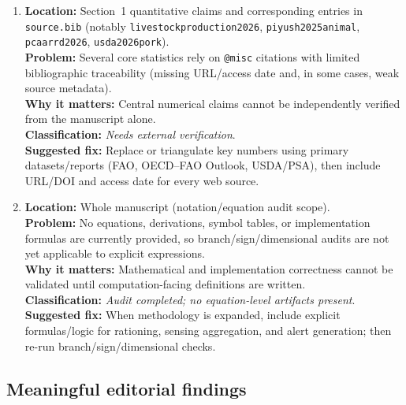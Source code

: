 \documentclass[11pt]{article}
\begin{document}
\begin{enumerate}[leftmargin=*]
  \item \textbf{Location:} Section~1 quantitative claims and corresponding entries in \texttt{source.bib} (notably \texttt{livestockproduction2026}, \texttt{piyush2025animal}, \texttt{pcaarrd2026}, \texttt{usda2026pork}).\\
        \textbf{Problem:} Several core statistics rely on \texttt{@misc} citations with limited bibliographic traceability (missing URL/access date and, in some cases, weak source metadata).\\
        \textbf{Why it matters:} Central numerical claims cannot be independently verified from the manuscript alone.\\
        \textbf{Classification:} \emph{Needs external verification}.\\
        \textbf{Suggested fix:} Replace or triangulate key numbers using primary datasets/reports (FAO, OECD--FAO Outlook, USDA/PSA), then include URL/DOI and access date for every web source.

  \item \textbf{Location:} Whole manuscript (notation/equation audit scope).\\
        \textbf{Problem:} No equations, derivations, symbol tables, or implementation formulas are currently provided, so branch/sign/dimensional audits are not yet applicable to explicit expressions.\\
        \textbf{Why it matters:} Mathematical and implementation correctness cannot be validated until computation-facing definitions are written.\\
        \textbf{Classification:} \emph{Audit completed; no equation-level artifacts present}.\\
        \textbf{Suggested fix:} When methodology is expanded, include explicit formulas/logic for rationing, sensing aggregation, and alert generation; then re-run branch/sign/dimensional checks.
\end{enumerate}

\subsection*{Meaningful editorial findings}
\end{document}
